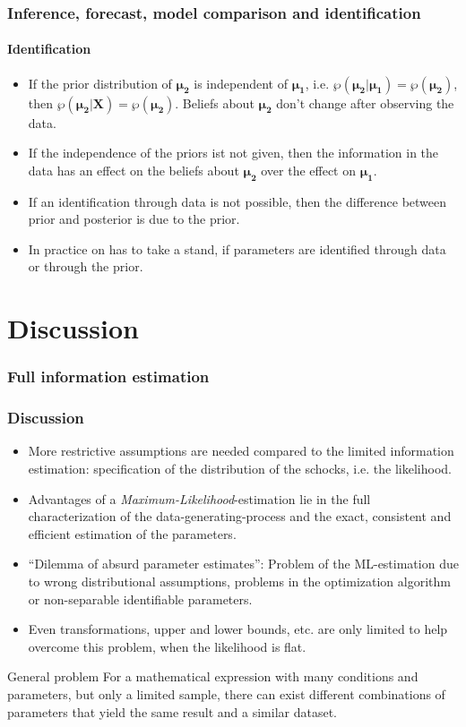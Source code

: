 \documentclass{beamer} %
\begin{document}
\begin{frame}\frametitle{Inference, forecast, model comparison and identification}\framesubtitle{Identification}
\begin{itemize}
  \item If the prior distribution of $\boldsymbol{\mu_2}$ is independent of $\boldsymbol{\mu_1}$, i.e. $\wp (\boldsymbol{\mu_2}|\boldsymbol{\mu_1})=\wp(\boldsymbol{\mu_2})$, then $\wp(\boldsymbol{\mu_2}|\mathbf{X})=\wp(\boldsymbol{\mu_2})$. Beliefs about $\boldsymbol{\mu_2}$ don't change after observing the data.
  \item If the independence of the priors ist not given, then the information in the data has an effect on the beliefs about $\boldsymbol{\mu_2}$ over the effect on $\boldsymbol{\mu_1}$.
  \item If an identification through data is not possible, then the difference between prior and posterior is due to the prior.
  \item In practice on has to take a stand, if parameters are identified through data or through the prior.
\end{itemize}
\end{frame}


\section{Discussion}
\begin{frame}\frametitle{Full information estimation}
  \tableofcontents[currentsection]
\end{frame}

\begin{frame}\frametitle{Discussion}
  \begin{itemize}
       \item More restrictive assumptions are needed compared to the limited information estimation: specification of the distribution of the schocks, i.e. the likelihood.
    \item Advantages of a \emph{Maximum-Likelihood}-estimation lie in the full characterization of the data-generating-process and the exact, consistent and efficient estimation of the parameters.
    \item \enquote{Dilemma of absurd parameter estimates}: Problem of the ML-estimation due to wrong distributional assumptions, problems in the optimization algorithm or non-separable identifiable parameters.
    \item Even transformations, upper and lower bounds, etc. are only limited to help overcome this problem, when the likelihood is flat.
  \end{itemize}
  \begin{block}{General problem} For a mathematical expression with many conditions and parameters, but only a limited sample, there can exist different combinations of parameters that yield the same result and a similar dataset.\end{block}

\end{frame}
\end{document}

